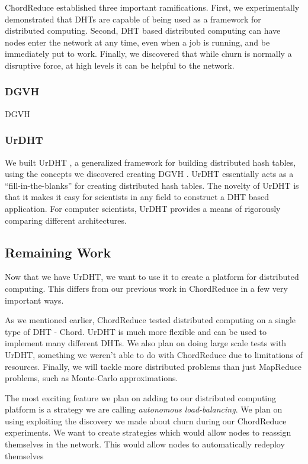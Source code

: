 \documentclass[12pt,a4paper]{article}
\begin{document}
ChordReduce established three important ramifications.
First, we experimentally demonstrated that DHTs are capable of being used as a framework for distributed computing.
Second, DHT based distributed computing can have nodes enter the network at any time, even when a job is running, and be immediately put to work.
Finally, we discovered that while churn is normally a disruptive force, at high levels it can be helpful to the network.

\subsubsection*{DGVH}

DGVH


\subsubsection*{UrDHT}


We built UrDHT \cite{urdht}, a generalized framework for building distributed hash tables, using the concepts we discovered creating DGVH \cite{dgvh}.
UrDHT essentially acts as a ``fill-in-the-blanks'' for creating  distributed hash tables.
The novelty of UrDHT is that it makes it easy for scientists in any field to construct a DHT based application.
For computer scientists, UrDHT provides a means of rigorously comparing different architectures.



\subsection*{Remaining Work}
Now that we have UrDHT, we want to use it to create a platform for distributed computing.
This differs from our previous work in ChordReduce in a few very important ways.

As we mentioned earlier, ChordReduce tested distributed computing on a single type of DHT - Chord.
UrDHT is much more flexible and can be used to implement many different DHTs.
We also plan on doing large scale tests with UrDHT, something we weren't able to do with ChordReduce due to limitations of resources.
Finally, we will tackle more distributed problems than just MapReduce problems, such as Monte-Carlo approximations.


The most exciting feature we plan on adding to our distributed computing platform is a strategy we are calling \textit{autonomous load-balancing}.
We plan on using exploiting the discovery we made about churn during our ChordReduce experiments.
We want to create strategies which would allow nodes to reassign themselves in the network.
This would allow nodes to automatically redeploy themselves 
\end{document}
